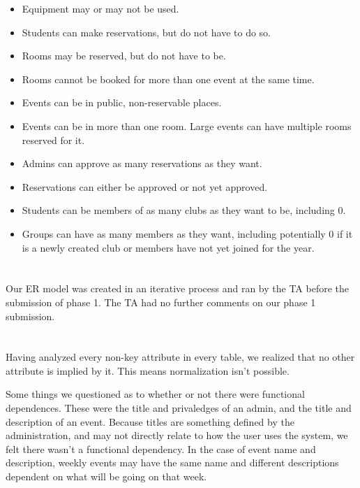 \documentclass{article}
\begin{document}
\begin{itemize}
\item Equipment may or may not be used. 
\item  Students can make reservations, but do not have to do so.
\item Rooms may be reserved, but do not have to be.
\item Rooms cannot be booked for more than one event at the same time. 
\item Events can be in public, non-reservable places.
\item Events can be in more than one room. Large events can have multiple rooms
reserved for it.
\item Admins can approve as many reservations as they want.
\item Reservations can either be approved or not yet approved.
\item Students can be members of as many clubs as they want to be, including 0.
\item Groups can have as many members as they want, including potentially 0 if
it is a newly created club or members have not yet joined for the year.
\end{itemize}



\section{}
Our ER model was created in an iterative process and ran by the TA before
the submission of phase 1. The TA had no further comments on our phase 1
submission. 

\section{}


\section{}
Having analyzed every non-key attribute in every table, we realized that no
other attribute is implied by it. This means normalization isn't possible. 

Some things we questioned as to whether or not there were functional
dependences. These were the title and privaledges of an admin, and the title and
description of an event. Because titles are something defined by the
administration, and may not directly relate to how the user uses the system, we
felt there wasn't a functional dependency. In the case of event name and
description, weekly events may have the same name and different descriptions
dependent on what will be going on that week.
\end{document}
